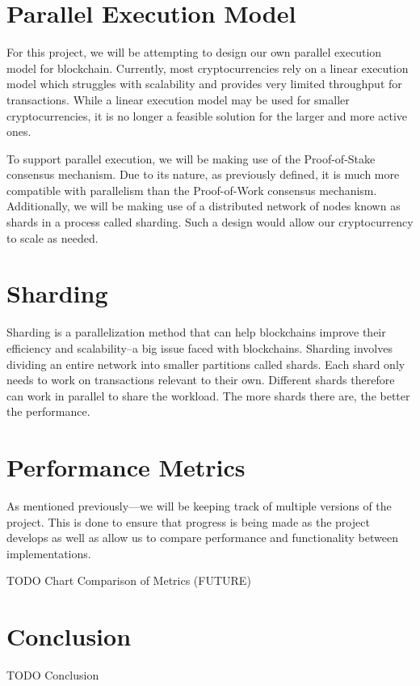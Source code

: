 \section{Parallel Execution Model}

For this project, we will be attempting to design our own parallel execution model for blockchain. Currently, most cryptocurrencies rely on a linear execution model which struggles with scalability and provides very limited throughput for transactions. While a linear execution model may be used for smaller cryptocurrencies, it is no longer a feasible solution for the larger and more active ones.

To support parallel execution, we will be making use of the Proof-of-Stake consensus mechanism. Due to its nature, as previously defined, it is much more compatible with parallelism than the Proof-of-Work consensus mechanism. Additionally, we will be making use of a distributed network of nodes known as shards in a process called sharding. Such a design would allow our cryptocurrency to scale as needed.

\section{Sharding}

Sharding is a parallelization method that can help blockchains improve their efficiency and scalability–a big issue faced with blockchains. Sharding involves dividing an entire network into smaller partitions called shards. Each shard only needs to work on transactions relevant to their own. Different shards therefore can work in parallel to share the workload. The more shards there are, the better the performance.

\section{Performance Metrics}

As mentioned previously—we will be keeping track of multiple versions of the project. This is done to ensure that progress is being made as the project develops as well as allow us to compare performance and functionality between implementations.

TODO Chart Comparison of Metrics (FUTURE)

\section{Conclusion}
TODO Conclusion

\cite{book}



